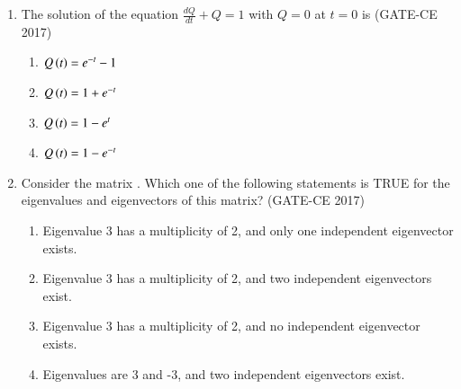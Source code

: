 \documentclass[journal,12pt,onecolumn]{article}
\theoremstyle{remark}
\begin{document}
\begin{enumerate}
    \item The solution of the equation $\frac{dQ}{dt} + Q = 1$ with $Q = 0$ at $t = 0$ is \hfill (GATE-CE 2017)
    \begin{multicols}{2}
    \begin{enumerate}
        \item $Q\left(t\right) = e^{-t} - 1$
        \item $Q\left(t\right) = 1 + e^{-t}$
        \item $Q\left(t\right) = 1 - e^{t}$
        \item $Q\left(t\right) = 1 - e^{-t}$
    \end{enumerate}
    \end{multicols}

    \item Consider the matrix . Which one of the following statements is TRUE for the eigenvalues and eigenvectors of this matrix? \hfill (GATE-CE 2017)
    \begin{enumerate}
        \item Eigenvalue 3 has a multiplicity of 2, and only one independent eigenvector exists.
        \item Eigenvalue 3 has a multiplicity of 2, and two independent eigenvectors exist.
        \item Eigenvalue 3 has a multiplicity of 2, and no independent eigenvector exists.
        \item Eigenvalues are 3 and -3, and two independent eigenvectors exist.
    \end{enumerate}


\end{enumerate}
\end{document}
